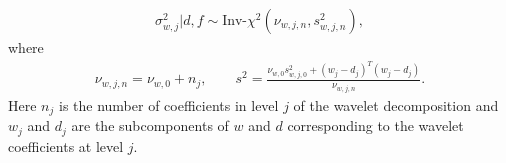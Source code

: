 \documentclass[a4paper,11pt]{article}
\begin{document}
\begin{itemize}
\begin{align*}
 \sigma^{2}_{w,j} | d,f \sim \textrm{Inv-}\chi^{2}(\nu_{w,j,n},s_{w,j,n}^{2}) ,
\end{align*} 
where 
\begin{align*}
 \nu_{w,j,n} = \nu_{w,0} + n_{j} , \qquad s^{2} = \frac{\nu_{w,0}s_{w,j,0}^{2}+(w_{j}-d_{j})^{T}(w_{j}-d_{j})}{\nu_{w,j,n}} .
\end{align*}
Here $n_{j}$ is the number of coefficients in level $j$ of the wavelet decomposition and $w_{j}$ and $d_{j}$ are the subcomponents of $w$ and $d$ corresponding to the wavelet coefficients at level $j$.
\end{itemize}
\end{document}
